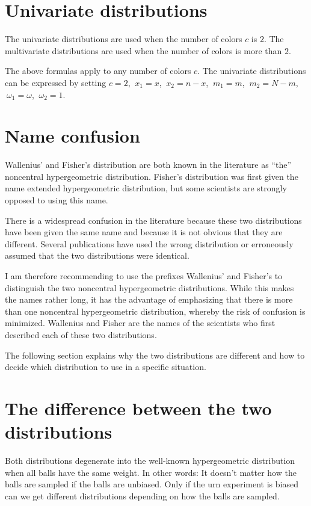 \documentclass[a4paper]{article}
\begin{document}
\section{Univariate distributions}
%
The univariate distributions are used when the number of colors
$c$ is $2$. The multivariate distributions are used when the number 
of colors is more than $2$.

The above formulas apply to any number of colors $c$. The univariate
distributions can be expressed by setting 
$c=2$, $\:x_1=x$, $\:x_2=n-x$, $\:m_1=m$, $\:m_2=N-m$,
$\:\omega_1=\omega$, $\:\omega_2=1$.


\section{Name confusion}
Wallenius' and Fisher's distribution are both known in the literature
as ``the'' noncentral hypergeometric distribution. Fisher's distribution
was first given the name extended hypergeometric distribution, but
some scientists are strongly opposed to using this name.

There is a widespread confusion in the literature because these two
distributions have been given the same name and because it is not obvious that
they are different. Several publications have used the wrong distribution
or erroneously assumed that the two distributions were identical.

I am therefore recommending to use the prefixes Wallenius' and Fisher's
to distinguish the two noncentral hypergeometric distributions. While this
makes the names rather long, it has the advantage of emphasizing that there
is more than one noncentral hypergeometric distribution, whereby the
risk of confusion is minimized. 
Wallenius and Fisher are the names of the scientists who first described each of
these two distributions.

The following section explains why the two distributions are different and
how to decide which distribution to use in a specific situation.


\section{The difference between the two distributions}
%
Both distributions degenerate into the well-known hypergeometric distribution
when all balls have the same weight. In other words: It doesn't matter how
the balls are sampled if the balls are unbiased. Only if the urn experiment
is biased can we get different distributions depending on how the balls are
sampled.
\end{document}
